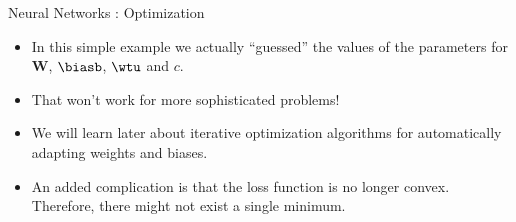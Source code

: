 \begin{frame} {Neural Networks : Optimization}
  \begin{itemize}
    \item In this simple example we actually \enquote{guessed} the values of the parameters for $\textbf{W}$, $\biasb$, $\wtu$ and $c$.
    \vspace{3mm}
    \item That won't work for more sophisticated problems!
    \vspace{3mm}
    \item We will learn later about iterative optimization algorithms for automatically adapting weights and biases.
    \vspace{3mm}
    \item An added complication is that the loss function is no longer convex. Therefore, there might not exist a single minimum. 
  \end{itemize}
\end{frame}

\endlecture
